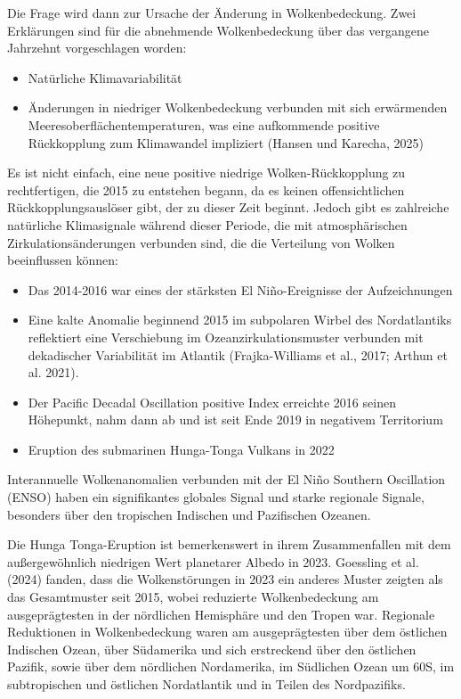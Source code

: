 \documentclass[12pt,paper=a4,DIV=12,parskip=never,chapterprefix=false,headings=standardclasses]{scrreprt}
\begin{document}
Die Frage wird dann zur Ursache der Änderung in Wolkenbedeckung. Zwei Erklärungen sind für die abnehmende Wolkenbedeckung über das vergangene Jahrzehnt vorgeschlagen worden:

\begin{itemize}
\item Natürliche Klimavariabilität 
\item Änderungen in niedriger Wolkenbedeckung verbunden mit sich erwärmenden Meeresoberflächentemperaturen, was eine aufkommende positive Rückkopplung zum Klimawandel impliziert (Hansen und Karecha, 2025)
 
\end{itemize}

Es ist nicht einfach, eine neue positive niedrige Wolken-Rückkopplung zu rechtfertigen, die 2015 zu entstehen begann, da es keinen offensichtlichen Rückkopplungsauslöser gibt, der zu dieser Zeit beginnt. Jedoch gibt es zahlreiche natürliche Klimasignale während dieser Periode, die mit atmosphärischen Zirkulationsänderungen verbunden sind, die die Verteilung von Wolken beeinflussen können:

\begin{itemize}
\item Das 2014-2016 war eines der stärksten El Niño-Ereignisse der Aufzeichnungen 
\item Eine kalte Anomalie beginnend 2015 im subpolaren Wirbel des Nordatlantiks reflektiert eine Verschiebung im Ozeanzirkulationsmuster verbunden mit dekadischer Variabilität im Atlantik (Frajka-Williams et al., 2017; Arthun et al. 2021). 
\item Der Pacific Decadal Oscillation positive Index erreichte 2016 seinen Höhepunkt, nahm dann ab und ist seit Ende 2019 in negativem Territorium 
\item Eruption des submarinen Hunga-Tonga Vulkans in 2022 
\end{itemize}


Interannuelle Wolkenanomalien verbunden mit der El Niño Southern Oscillation (ENSO) haben ein signifikantes globales Signal und starke regionale Signale, besonders über den tropischen Indischen und Pazifischen Ozeanen.

Die Hunga Tonga-Eruption ist bemerkenswert in ihrem Zusammenfallen mit dem außergewöhnlich niedrigen Wert planetarer Albedo in 2023. Goessling et al. (2024) fanden, dass die Wolkenstörungen in 2023 ein anderes Muster zeigten als das Gesamtmuster seit 2015, wobei reduzierte Wolkenbedeckung am ausgeprägtesten in der nördlichen Hemisphäre und den Tropen war. Regionale Reduktionen in Wolkenbedeckung waren am ausgeprägtesten über dem östlichen Indischen Ozean, über Südamerika und sich erstreckend über den östlichen Pazifik, sowie über dem nördlichen Nordamerika, im Südlichen Ozean um 60S, im subtropischen und östlichen Nordatlantik und in Teilen des Nordpazifiks.
\end{document}
